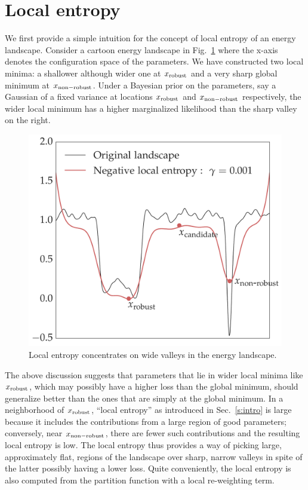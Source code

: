 \documentclass[10pt]{article}
\begin{document}
\section{Local entropy}
\label{s:local_entropy}

We first provide a simple intuition for the concept of local entropy of an energy landscape. Consider a cartoon energy landscape in Fig.~\ref{fig:entropyfig} where the x-axis denotes the configuration space of the parameters. We have constructed two local minima: a shallower although wider one at $x_{\mathrm{robust}}$ and a very sharp global minimum at $x_{\mathrm{non-robust}}$. Under a Bayesian prior on the parameters, say a Gaussian of a fixed variance at locations $x_{\mathrm{robust}}$ and $x_{\mathrm{non-robust}}$ respectively, the wider local minimum has a higher marginalized likelihood than the sharp valley on the right.

\begin{figure}
\centering
\includegraphics[width=0.4 \textwidth]{entropyfig.pdf}
\caption{\small Local entropy concentrates on wide valleys in the energy landscape.}
\label{fig:entropyfig}
\vspace*{-0.1in}
\end{figure}

The above discussion suggests that parameters that lie in wider local minima like $x_{\mathrm{robust}}$, which may possibly have a higher loss than the global minimum, should generalize better than the ones that are simply at the global minimum. In a neighborhood of $x_{\mathrm{robust}}$, ``local entropy'' as introduced in Sec.~\ref{s:intro} is large because it includes the contributions from a large region of good parameters; conversely, near $x_{\mathrm{non-robust}}$, there are fewer such contributions and the resulting local entropy is low. The local entropy thus provides a way of picking large, approximately flat, regions of the landscape over sharp, narrow valleys in spite of the latter possibly having a lower loss. Quite conveniently, the local entropy is also computed from the partition function with a local re-weighting term.
\end{document}
